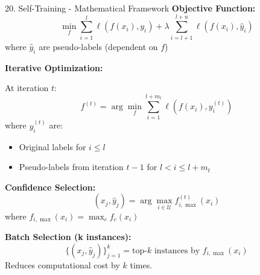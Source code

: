 \documentclass[8pt]{beamer}
\begin{document}
	\begin{frame}{20. Self-Training - Mathematical Framework}
		\fontsize{6.5}{7.5}\selectfont
		\textbf{Objective Function:}
		\[
		\min_f \sum_{i=1}^l \ell(f(x_i), y_i) + \lambda \sum_{i=l+1}^{l+u} \ell(f(x_i), \hat{y}_i)
		\]
		where $\hat{y}_i$ are pseudo-labels (dependent on $f$)
		
		\textbf{Iterative Optimization:}
		
		At iteration $t$:
		\[
		f^{(t)} = \arg\min_f \sum_{i=1}^{l + m_t} \ell(f(x_i), y_i^{(t)})
		\]
		where $y_i^{(t)}$ are:
		\begin{itemize}
			\item Original labels for $i \leq l$
			\item Pseudo-labels from iteration $t-1$ for $l < i \leq l + m_t$
		\end{itemize}
		
		\textbf{Confidence Selection:}
		\[
		(x_j, \hat{y}_j) = \arg\max_{i \in \mathcal{U}} f_{i, \max}^{(t)}(x_i)
		\]
		where $f_{i,\max}(x_i) = \max_c f_c(x_i)$
		
		\textbf{Batch Selection (k instances):}
		\[
		\{(x_j, \hat{y}_j)\}_{j=1}^k = \text{top-}k \text{ instances by } f_{i,\max}(x_i)
		\]
		Reduces computational cost by $k$ times.
	\end{frame}
	
\end{document}
